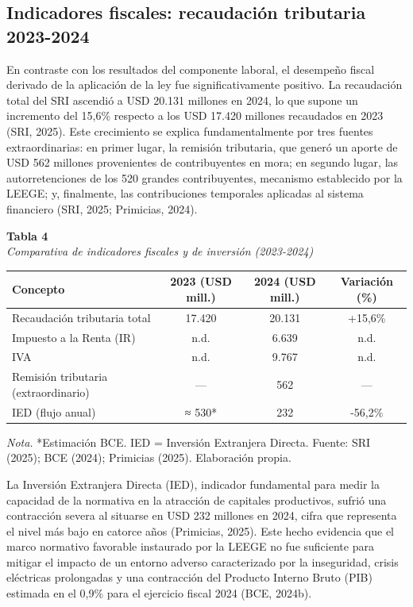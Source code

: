 \documentclass[12pt,spanish]{article}
\newcounter{none}
\begin{document}
\subsection{Indicadores fiscales: recaudación tributaria
2023-2024}\label{indicadores-fiscales-recaudaciuxf3n-tributaria-2023-2024}

En contraste con los resultados del componente laboral, el desempeño
fiscal derivado de la aplicación de la ley fue significativamente
positivo. La recaudación total del SRI ascendió a USD 20.131 millones en
2024, lo que supone un incremento del 15,6\% respecto a los USD 17.420
millones recaudados en 2023 (SRI, 2025). Este crecimiento se explica
fundamentalmente por tres fuentes extraordinarias: en primer lugar, la
remisión tributaria, que generó un aporte de USD 562 millones
provenientes de contribuyentes en mora; en segundo lugar, las
autorretenciones de los 520 grandes contribuyentes, mecanismo
establecido por la LEEGE; y, finalmente, las contribuciones temporales
aplicadas al sistema financiero (SRI, 2025; Primicias, 2024).

\textbf{Tabla 4}\\
\emph{Comparativa de indicadores fiscales y de inversión (2023-2024)}

{\def\LTcaptype{none} %
\begin{longtable}[]{@{}lccc@{}}
\toprule\noalign{}
Concepto & 2023 (USD mill.) & 2024 (USD mill.) & Variación (\%) \\
\midrule\noalign{}
\endhead
\bottomrule\noalign{}
\endlastfoot
Recaudación tributaria total & 17.420 & 20.131 & +15,6\% \\
Impuesto a la Renta (IR) & n.d. & 6.639 & n.d. \\
IVA & n.d. & 9.767 & n.d. \\
Remisión tributaria (extraordinario) & --- & 562 & --- \\
IED (flujo anual) & ≈ 530* & 232 & -56,2\% \\
\end{longtable}
}

\emph{Nota.} *Estimación BCE. IED = Inversión Extranjera Directa.
Fuente: SRI (2025); BCE (2024); Primicias (2025). Elaboración propia.

La Inversión Extranjera Directa (IED), indicador fundamental para medir
la capacidad de la normativa en la atracción de capitales productivos,
sufrió una contracción severa al situarse en USD 232 millones en 2024,
cifra que representa el nivel más bajo en catorce años (Primicias,
2025). Este hecho evidencia que el marco normativo favorable instaurado
por la LEEGE no fue suficiente para mitigar el impacto de un entorno
adverso caracterizado por la inseguridad, crisis eléctricas prolongadas
y una contracción del Producto Interno Bruto (PIB) estimada en el 0,9\%
para el ejercicio fiscal 2024 (BCE, 2024b).
\end{document}
